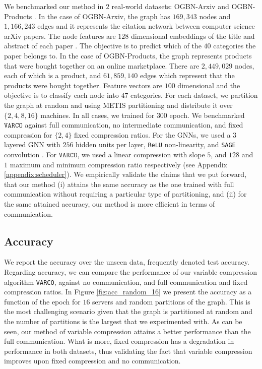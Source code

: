 \documentclass[lettersize,journal]{IEEEtran}
\newcommand{\algo}{\texttt{VARCO}}
\begin{document}
We benchmarked our method in $2$ real-world datasets: OGBN-Arxiv \cite{wang2020microsoft} and OGBN-Products \cite{Bhatia16}. In the case of OGBN-Arxiv, the graph has $169,343$ nodes and $1,166,243$ edges and it represents the citation network between computer science arXiv papers. The node features are $128$ dimensional embeddings of the title and abstract of each paper \cite{NIPS2013_9aa42b31}. The objective is to predict which of the $40$ categories the paper belongs to. In the case of OGBN-Products, the graph represents products that were bought together on an online marketplace. 
There are $2,449,029$ nodes, each of which is a product, and $61,859,140$ edges which represent that the products were bought together. Feature vectors are $100$ dimensional and the objective is to classify each node into $47$ categories.  For each dataset, we partition the graph at random and using METIS partitioning \cite{karypis1997metis} and distribute it over $\{2,4,8,16\}$ machines. In all cases, we trained for $300$ epoch. We benchmarked $\algo$ against full communication, no intermediate communication, and fixed compression for $\{2,4\}$ fixed compression ratios. For the GNNs, we used a $3$ layered GNN with $256$ hidden units per layer,  \texttt{ReLU} non-linearity, and \texttt{SAGE} convolution \cite{hamilton2017inductive}. 
For $\algo$, we used a linear compression with slope $5$, and $128$ and $1$ maximum and minimum compression ratio respectively (see Appendix \ref{appendix:scheduler}). We empirically validate the claims that we put forward, that our method (i) attains the same accuracy as the one trained with full communication without requiring a particular type of partitioning, and (ii) for the same attained accuracy, our method is more efficient in terms of communication.

\subsection{Accuracy}
We report the accuracy over the unseen data, frequently denoted test accuracy. Regarding accuracy, we can compare the performance of our variable compression algorithm \texttt{VARCO}, against no communication, and full communication and fixed compression ratios. In Figure \ref{fig:acc_random_16} we present the accuracy as a function of the epoch for $16$ servers and random partitions of the graph. This is the most challenging scenario given that the graph is partitioned at random and the number of partitions is the largest that we experimented with. As can be seen, our method of variable compression attains a better performance than the full communication. What is more, fixed compression has a degradation in performance in both datasets, thus validating the fact that variable compression improves upon fixed compression and no communication. 
\end{document}

